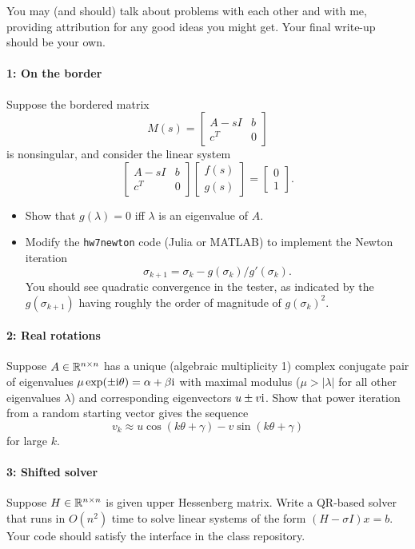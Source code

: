 \documentclass[12pt, leqno]{article} %
\begin{document}

You may (and should) talk about problems with each other and with me,
providing attribution for any good ideas you might get.  Your final
write-up should be your own.


\paragraph*{1: On the border}
Suppose the bordered matrix
\[
  M(s) =
  \begin{bmatrix}
    A-s I & b \\
    c^T & 0
  \end{bmatrix}
\]
is nonsingular, and consider the linear system
\[
  \begin{bmatrix} A-s I & b \\ c^T & 0 \end{bmatrix}
  \begin{bmatrix} f(s) \\ g(s) \end{bmatrix} =
  \begin{bmatrix} 0 \\ 1 \end{bmatrix}.
\]
\begin{itemize}
\item
  Show that $g(\lambda) = 0$ iff $\lambda$ is an eigenvalue of $A$.
\item
  Modify the {\tt hw7newton} code (Julia or MATLAB) to implement the
  Newton iteration
  \[
  \sigma_{k+1} = \sigma_k - g(\sigma_k)/g'(\sigma_k).
  \]
  You should see quadratic convergence in the tester, as indicated by
  the $g(\sigma_{k+1})$ having roughly the order of magnitude
  of $g(\sigma_k)^2$.
\end{itemize}

\paragraph*{2: Real rotations}
Suppose $A \in \mathbb{R}^{n \times n}$ has a unique (algebraic multiplicity 1)
complex conjugate pair of eigenvalues $\mu \exp(\pm \mathrm{i} \theta) = \alpha + \beta \mathrm{i}$ with maximal
modulus ($\mu > |\lambda|$ for all other eigenvalues $\lambda$) and
corresponding eigenvectors $u \pm v \mathrm{i}$.  Show that power iteration
from a random starting vector gives the sequence
\[
  v_k \approx u \cos(k\theta + \gamma) - v \sin(k\theta+\gamma)
\]
for large $k$.

\paragraph*{3: Shifted solver}
Suppose $H \in \mathbb{R}^{n \times n}$ is given upper Hessenberg matrix.
Write a QR-based solver that runs in $O(n^2)$ time to solve linear
systems of the form $(H-\sigma I) x = b$.
Your code should satisfy the interface in the class repository.
\end{document}
